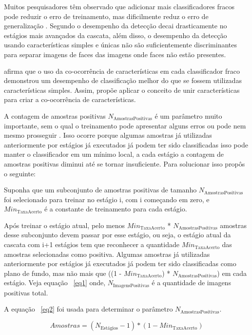 Muitos pesquisadores têm observado que adicionar mais classificadores fracos pode reduzir o erro de treinamento, mas dificilmente reduz o erro de generalização \cite{LiZhang} \cite{Brubaker} \cite{Mita}. Segundo  o desempenho da detecção decai drasticamente no estágios mais avançados da cascata, além disso, o desempenho da detecção usando características simples e únicas não são suficientemente discriminantes para separar imagens de faces das imagens onde faces não estão presentes. 

 afirma que o uso da co-ocorrência de características em cada classificador fraco demonstrou um desempenho de classificação melhor do que se fossem utilizadas características simples. Assim,  propõe aplicar o conceito de unir características para criar a co-ocorrência de características. 

A contagem de amostras positivas \(N_{\text{AmostrasPositivas}}\) é um parâmetro muito importante, sem o qual o treinamento pode apresentar alguns erros ou pode nem mesmo prosseguir \cite{Mita}. Isso ocorre porque algumas amostras já utilizadas anteriormente por estágios já executados já podem ter sido classificadas isso pode manter o classificador em um mínimo local, a cada estágio a contagem de amostras positivas diminui até se tornar insuficiente. Para solucionar isso  propôs o seguinte:

Suponha que um subconjunto de amostras positivas de tamanho \(N_{\text{AmostrasPositivas}}\) foi selecionado para treinar no estágio i, com i começando em zero, e \(Min_{\text{TaxaAcerto}}\) é a constante de treinamento para cada estágio.

Após treinar o estágio atual, pelo menos \(Min_{\text{TaxaAcerto}}\) * \(N_{\text{AmostrasPositivas}}\) amostras desse subconjunto devem passar por esse estágio, ou seja, o estágio atual da cascata com i+1 estágios tem que reconhecer a quantidade \(Min_{\text{TaxaAcerto}}\) das amostras selecionadas como positiva. Algumas amostras já utilizadas anteriormente por estágios já executados já podem ter sido classificadas como plano de fundo, mas não mais que ((1 - \(Min_{\text{TaxaAcerto}}\)) * \(N_{\text{AmostrasPositivas}}\)) em cada estágio. Veja equação ~\ref{eq1} onde, \(N_{\text{ImagensPositivas}}\) é a quantidade de imagens positivas total.

A equação ~\ref{eq2} foi usada para determinar o parâmetro \(N_{\text{AmostrasPositivas}}\).

\begin{equation}
\label{eq1} 
Amostras = ( N_{\text{Estágios}} - 1 ) * (1 - Min_{\text{TaxaAcerto}})
\end{equation} 

